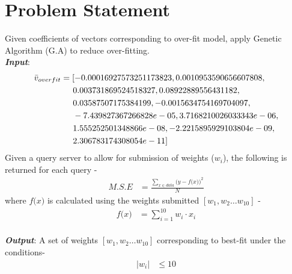 \documentclass[11pt]{article}
\begin{document}
	\section{Problem Statement}
	Given coefficients of vectors corresponding to over-fit model, apply Genetic Algorithm (G.A) to reduce over-fitting. 
	\\
	\textbf{\emph{Input}}:
	\begin{align*}
		\bar{v}_{overfit}&= [-0.00016927573251173823, 0.0010953590656607808,
		\\ & \hspace{0.5cm} 0.003731869524518327, 0.08922889556431182,
		\\ & \hspace{0.5cm} 0.03587507175384199, -0.0015634754169704097,
		\\ & \hspace{0.5cm} -7.439827367266828e-05, 3.7168210026033343e-06, 
		\\ & \hspace{0.5cm} 1.555252501348866e-08, -2.2215895929103804e-09, 
		\\  & \hspace{0.5cm}2.306783174308054e-11]
	\end{align*}
	Given a query server to allow for submission of weights ($w_i$), the following is returned for each query - 
	\begin{align*}
		M.S.E &= \frac{\sum_{x\in data} \big(y - f\big(x\big)\big)^{2}}{N}
	\end{align*}
	where $f\big(x\big)$ is calculated using the weights submitted $[w_1,w_2 \ldots w_{10}]$ - 
	\begin{align*}
		f\big(x\big) &= \sum_{i=1}^{10} w_i\cdot x_i
	\end{align*}
	\\	
	\textbf{\emph{Output}}:	
	A set of weights $[w_1,w_2 \ldots w_{10}]$ corresponding to best-fit under the conditions- 
	\begin{align*}
		|w_i| &\leq 10
	\end{align*}
\end{document}
